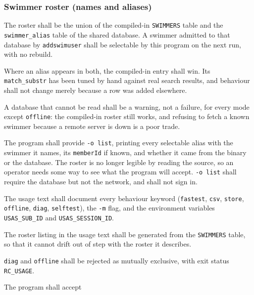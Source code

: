 \documentclass[12pt]{article}
\newcommand{\code}[1]{\texttt{#1}}
\newcommand{\req}[1]{\textbf{[#1]}}
\begin{document}
\subsubsection{Swimmer roster (names and aliases)}
\label{sec:roster}

\begin{description}[style=nextline]
  \item[\req{REQ-R-01}] The roster shall be the union of the compiled-in
        \code{SWIMMERS} table and the \code{swimmer\_alias} table of the
        shared database.  A swimmer admitted to that database by
        \code{addswimuser} shall be selectable by this program on the
        next run, with no rebuild.
  \item[\req{REQ-R-02}] Where an alias appears in both, the compiled-in
        entry shall win.  Its \code{match\_substr} has been tuned by
        hand against real search results, and behaviour shall not change
        merely because a row was added elsewhere.
  \item[\req{REQ-R-03}] A database that cannot be read shall be a
        warning, not a failure, for every mode except \code{offline}:
        the compiled-in roster still works, and refusing to fetch a
        known swimmer because a remote server is down is a poor trade.
  \item[\req{REQ-R-04}] The program shall provide \code{-o list},
        printing every selectable alias with the swimmer it names, its
        \code{memberId} if known, and whether it came from the binary or
        the database.  The roster is no longer legible by reading the
        source, so an operator needs some way to see what the program
        will accept.  \code{-o list} shall require the database but not
        the network, and shall not sign in.
  \item[\req{REQ-F-05}] The usage text shall document every behaviour
        keyword (\code{fastest}, \code{csv}, \code{store},
        \code{offline}, \code{diag}, \code{selftest}), the \code{-m}
        flag, and the environment variables \code{USAS\_SUB\_ID} and
        \code{USAS\_SESSION\_ID}.
  \item[\req{REQ-F-06}] The roster listing in the usage text shall be
        generated from the \code{SWIMMERS} table, so that it cannot
        drift out of step with the roster it describes.
  \item[\req{REQ-F-07}] \code{diag} and \code{offline} shall be
        rejected as mutually exclusive, with exit status
        \code{RC\_USAGE}.
  \item[\req{REQ-F-18}] The program shall accept

\end{description}
\end{document}
